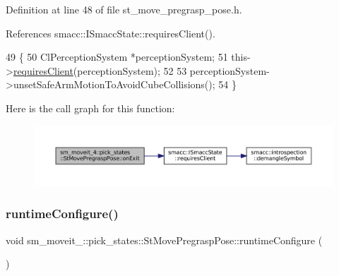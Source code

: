 Definition at line 48 of file st\+\_\+move\+\_\+pregrasp\+\_\+pose.\+h.



References smacc\+::\+I\+Smacc\+State\+::requires\+Client().


\begin{DoxyCode}
49             \{
50                 ClPerceptionSystem *perceptionSystem;
51                 this->\hyperlink{classsmacc_1_1ISmaccState_a7f95c9f0a6ea2d6f18d1aec0519de4ac}{requiresClient}(perceptionSystem);
52 
53                 perceptionSystem->unsetSafeArmMotionToAvoidCubeCollisions();
54             \}
\end{DoxyCode}
Here is the call graph for this function\+:
\nopagebreak
\begin{figure}[H]
\begin{center}
\leavevmode
\includegraphics[width=350pt]{structsm__moveit__4_1_1pick__states_1_1StMovePregraspPose_ae2f50199e1766c1bcdb8fcd25e9a0e16_cgraph}
\end{center}
\end{figure}
\mbox{\label{structsm__moveit__4_1_1pick__states_1_1StMovePregraspPose_ae9ffdf77d89169b5f4fb2cb2fadd56fc}} 
\subsubsection{\texorpdfstring{runtime\+Configure()}{runtimeConfigure()}}
{\footnotesize\ttfamily void sm\+\_\+moveit\+\_\+::pick\+\_\+states\+::\+St\+Move\+Pregrasp\+Pose\+::runtime\+Configure (\begin{DoxyParamCaption}{ }\end{DoxyParamCaption})\hspace{0.3cm}{\ttfamily [inline]}}



